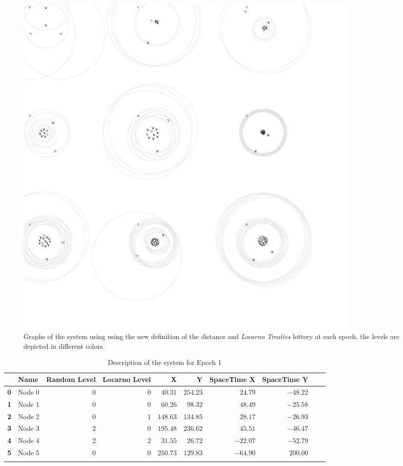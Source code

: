 \documentclass[a4paper,11pt,twoside=semi,openright]{report}
\begin{document}
\begin{figure}[!h] 
\centering
\includegraphics[width=500pt]{figures/SpaceTime-Locarno}
\caption{Graphs of the system using  using the new definition of the distance and \textit{Locarno Treaties} lottery at each epoch, the levels are depicted in different colors.}
  \label{fig:SpaceTime-Locarno}
\end{figure}


\begin{table}[h]
\centering
\tiny
\begin{tabular}{@{}llrrrrrrll@{}}
\toprule
& \textbf{Name}   &\textbf{Random Level} &\textbf{Locarno Level} & \textbf{X} & \textbf{Y} & \textbf{SpaceTime X} & \textbf{SpaceTime Y}  \\ \midrule
\textbf{0} & Node 0&$0$&$0$&$40.31$&$254.23$&$24.79$&$-48.22$&\\ \hdashline
\textbf{1} & Node 1&$0$&$0$&$60.26$&$98.32$&$48.49$&$-25.58$&\\ \hdashline
\textbf{2} & Node 2&$0$&$1$&$148.63$&$134.85$&$28.17$&$-26.93$&\\ \hdashline
\textbf{3} & Node 3&$2$&$0$&$195.48$&$236.62$&$45.51$&$-46.47$&\\ \hdashline
\textbf{4} & Node 4&$2$&$2$&$31.55$&$26.72$&$-22.07$&$-52.79$&\\ \hdashline
\textbf{5} & Node 5&$0$&$0$&$250.73$&$129.83$&$-64.90$&$200.00$&\\ \hdashline\midrule
\bottomrule
\end{tabular}
\caption{Description of the system for Epoch 1}
\end{table}
\end{document}
